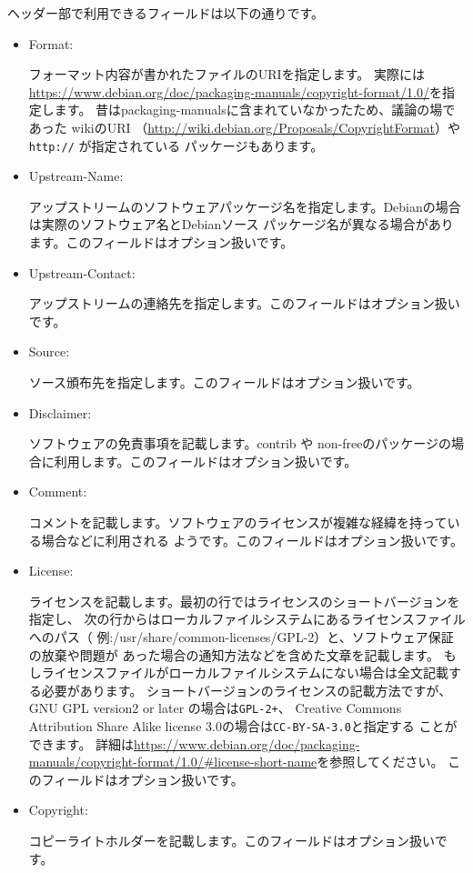 \documentclass[mingoth,a4paper]{jsarticle}
\begin{document}
ヘッダー部で利用できるフィールドは以下の通りです。
\begin{itemize}

  \item Format:

        フォーマット内容が書かれたファイルのURIを指定します。
        実際には\url{https://www.debian.org/doc/packaging-manuals/copyright-format/1.0/}を指定します。
        昔はpackaging-manualsに含まれていなかったため、議論の場であった wikiのURI
        （\url{http://wiki.debian.org/Proposals/CopyrightFormat}）や\texttt{http://} が指定されている
        パッケージもあります。

  \item Upstream-Name:

        アップストリームのソフトウェアパッケージ名を指定します。Debianの場合は実際のソフトウェア名とDebianソース
        パッケージ名が異なる場合があります。このフィールドはオプション扱いです。

  \item Upstream-Contact:

        アップストリームの連絡先を指定します。このフィールドはオプション扱いです。

  \item Source:

        ソース頒布先を指定します。このフィールドはオプション扱いです。

  \item  Disclaimer:

        ソフトウェアの免責事項を記載します。contrib や non-freeのパッケージの場合に利用します。このフィールドはオプション扱いです。

  \item  Comment:

        コメントを記載します。ソフトウェアのライセンスが複雑な経緯を持っている場合などに利用される
        ようです。このフィールドはオプション扱いです。

  \item  License:

         ライセンスを記載します。最初の行ではライセンスのショートバージョンを指定し、
         次の行からはローカルファイルシステムにあるライセンスファイルへのパス（
         例:/usr/share/common-licenses/GPL-2）と、ソフトウェア保証の放棄や問題が
         あった場合の通知方法などを含めた文章を記載します。
         もしライセンスファイルがローカルファイルシステムにない場合は全文記載す
         る必要があります。
         ショートバージョンのライセンスの記載方法ですが、GNU GPL version2 or later の場合は\texttt{GPL-2+}、
         Creative Commons Attribution Share Alike license 3.0の場合は\texttt{CC-BY-SA-3.0}と指定する
         ことができます。
         詳細は\url{https://www.debian.org/doc/packaging-manuals/copyright-format/1.0/#license-short-name}を参照してください。
         このフィールドはオプション扱いです。

  \item  Copyright:

         コピーライトホルダーを記載します。このフィールドはオプション扱いです。

\end{itemize}
\end{document}
